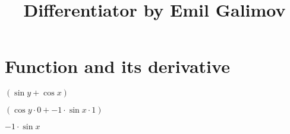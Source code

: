 \documentclass{article}
\title{Differentiator by Emil Galimov}
\begin{document}
\maketitle
\section{Function and its derivative}
\begin{center}
$( \sin{y}+ \cos{x})$\\
\end{center}
\begin{center}
$( \cos{y} \cdot 0+-1 \cdot  \sin{x} \cdot 1)$\\
\end{center}
\begin{center}
$-1 \cdot  \sin{x}$\\
\end{center}
\end{document}
